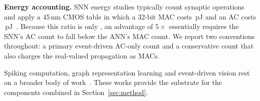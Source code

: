 \textbf{Energy accounting.} SNN energy studies typically count synaptic operations and apply a 45\,nm CMOS table in which a 32-bit MAC costs \MACPJ\,pJ and an AC costs \ACPJ\,pJ~\cite{horowitz2014,eshraghian2023}. Because this ratio is only \MACACRatio, an advantage of $5\times$ essentially requires the SNN's AC count to fall below the ANN's MAC count. We report two conventions throughout: a primary event-driven AC-only count and a conservative count that also charges the real-valued propagation as MACs.

Spiking computation, graph representation learning and event-driven vision rest on a broader body of work~\cite{maass1997,krizhevsky2009,lecun1998,orchard2015,li2017cifardvs,kugele2020,liu2022spikeconverter,zhou2025edge,ji2026gtdl,xia2026neuro,dualphase2024,bojkovic2024ot,yang2025csqcfs,jiang2025fission,sgnnbench2025,hwang2025onespike}. These works provide the substrate for the components combined in Section~\ref{sec:method}.
